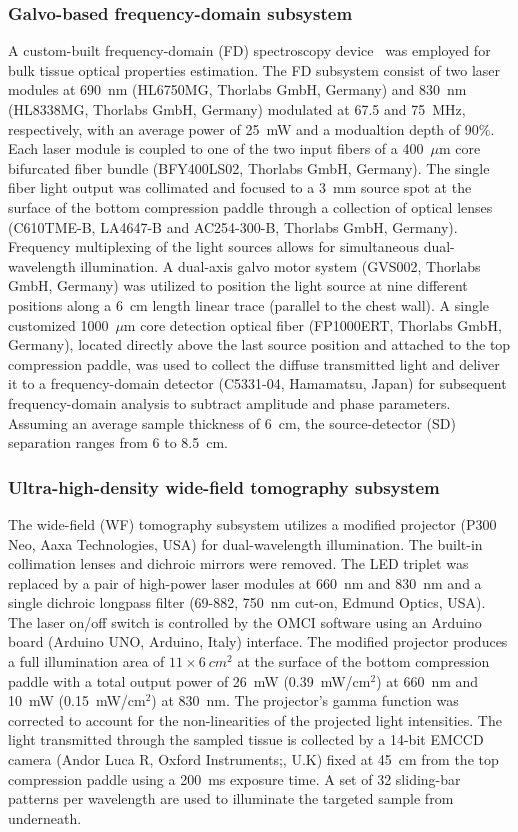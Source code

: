 \subsubsection{Galvo-based frequency-domain subsystem}
\label{sec:RF}
A custom-built frequency-domain (FD) spectroscopy device~\cite{Zimmermann2016} was employed for bulk tissue optical properties estimation. The FD subsystem consist of two laser modules at 690~nm (HL6750MG, Thorlabs GmbH, Germany) and 830~nm (HL8338MG, Thorlabs GmbH, Germany) modulated at 67.5 and 75~MHz, respectively, with an average power of 25~mW and a modualtion depth of 90\%. Each laser module is coupled to one of the two input fibers of a 400~$\mu$m core bifurcated fiber bundle (BFY400LS02, Thorlabs GmbH, Germany). The single fiber light output was collimated and focused to a 3~mm source spot at the surface of the bottom compression paddle through a collection of optical lenses (C610TME-B, LA4647-B and AC254-300-B, Thorlabs GmbH, Germany). Frequency multiplexing of the light sources allows for simultaneous dual-wavelength illumination. A dual-axis galvo motor system (GVS002, Thorlabs GmbH, Germany) was utilized to position the light source at nine different positions along a 6~cm length linear trace (parallel to the chest wall). A single customized 1000~$\mu$m core detection optical fiber (FP1000ERT, Thorlabs GmbH, Germany), located directly above the last source position and attached to the top compression paddle, was used to collect the diffuse transmitted light and deliver it to a frequency-domain detector (C5331-04, Hamamatsu, Japan) for subsequent frequency-domain analysis to subtract amplitude and phase parameters. Assuming an average sample thickness of 6~cm, the source-detector (SD) separation ranges from 6 to 8.5~cm.

\subsubsection{Ultra-high-density wide-field tomography subsystem}
\label{sec:WF}
The wide-field (WF) tomography subsystem utilizes a modified projector (P300 Neo, Aaxa Technologies, USA) for dual-wavelength illumination. The built-in collimation lenses and dichroic mirrors were removed. The LED triplet was replaced by a pair of high-power laser modules at 660~nm and 830~nm and a single dichroic longpass filter (69-882, 750~nm cut-on, Edmund Optics, USA). The laser on/off switch is controlled by the OMCI software using an Arduino board (Arduino UNO, Arduino, Italy) interface. The modified projector produces a full illumination area of $11\times6~cm^2$ at the surface of the bottom compression paddle with a total output power of 26~mW (0.39~mW/cm$^2$) at 660~nm and 10~mW (0.15~mW/cm$^2$) at 830~nm. The projector's gamma function was corrected to account for the non-linearities of the projected light intensities. The light transmitted through the sampled tissue is collected by a 14-bit EMCCD camera (Andor Luca R, Oxford Instruments;, U.K) fixed at 45~cm from the top compression paddle using a 200~ms exposure time. A set of 32 sliding-bar patterns per wavelength are used to illuminate the targeted sample from underneath.

